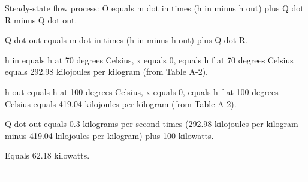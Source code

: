 Steady-state flow process:  
O equals m dot in times (h in minus h out) plus Q dot R minus Q dot out.  

Q dot out equals m dot in times (h in minus h out) plus Q dot R.  

h in equals h at 70 degrees Celsius, x equals 0, equals h f at 70 degrees Celsius equals 292.98 kilojoules per kilogram (from Table A-2).  

h out equals h at 100 degrees Celsius, x equals 0, equals h f at 100 degrees Celsius equals 419.04 kilojoules per kilogram (from Table A-2).  

Q dot out equals 0.3 kilograms per second times (292.98 kilojoules per kilogram minus 419.04 kilojoules per kilogram) plus 100 kilowatts.  

Equals 62.18 kilowatts.  

---